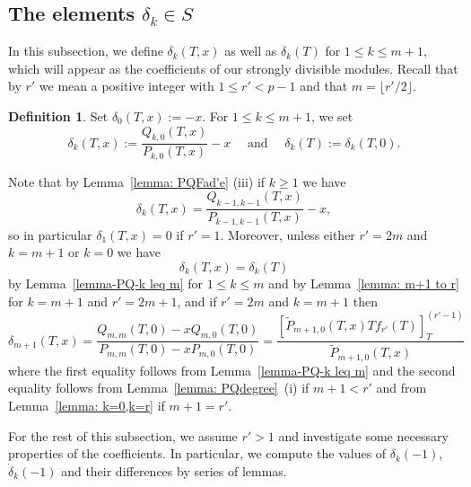 \documentclass[11pt]{amsart}
\theoremstyle{definition}
\numberwithin{equation}{subsection}
\theoremstyle{plain}
\theoremstyle{plain}
\theoremstyle{plain}
\theoremstyle{plain}
\theoremstyle{plain}
\theoremstyle{plain}
\theoremstyle{plain}
\theoremstyle{plain}
\theoremstyle{plain}
\theoremstyle{plain}
\theoremstyle{plain}
\theoremstyle{plain}
\theoremstyle{definition}
\newtheorem{defi}[equation]{Definition}
\theoremstyle{definition}
\theoremstyle{definition}
\theoremstyle{remark}
\renewcommand{\(}{\textup{(}}
\renewcommand{\)}{\textup{)}}
\begin{document}
\subsection{The elements $\delta_{k}\in S$}\label{subsec: the elements delta}
In this subsection, we define $\delta_{k}(T,x)$ as well as $\delta_k(T)$ for $1\leq k\leq m+1$, which will appear as the coefficients of our strongly divisible modules. Recall that by $r'$ we mean a positive integer with $1\leq r'<p-1$ and that $m=\lfloor r'/2\rfloor$.

\begin{defi}\label{defi: definition of delta}
Set $\delta_0(T,x):=-x$. For $1\leq k\leq m+1$, we set
\begin{equation*}
    \delta_k(T,x) :=\frac{Q_{k,0}(T,x)}{P_{k,0}(T,x)}-x\quad\mbox{ and }\quad \delta_k(T):=\delta_k(T,0).
\end{equation*}
\end{defi}

Note that by Lemma~\ref{lemma: PQFad'e} (iii) if $k\geq 1$ we have
    \begin{equation*}
        \delta_k(T,x)=\frac{Q_{k-1,k-1}(T,x)}{P_{k-1,k-1}(T,x)}-x,
    \end{equation*}
so in particular $\delta_1(T,x)=0$ if $r'=1$. Moreover, unless either $r'=2m$ and $k=m+1$ or $k=0$ we have $$\delta_{k}(T,x)=\delta_k(T)$$
by Lemma~\ref{lemma-PQ-k leq m} for $1\leq k\leq m$ and by Lemma~\ref{lemma: m+1 to r} for $k=m+1$ and $r'=2m+1$, and if $r'=2m$ and $k=m+1$ then
    \begin{equation*}
        \delta_{m+1}(T,x)=\frac{Q_{m,m}(T,0)-xQ_{m,0}(T,0)}{P_{m,m}(T,0)-xP_{m,0}(T,0)}=\frac{[\tilde P_{m+1,0}(T,x)Tf_{r'}(T)]_{T}^{(r'-1)}}{\tilde P_{m+1,0}(T,x)}
    \end{equation*}
where the first equality follows from Lemma~\ref{lemma-PQ-k leq m} and the second equality follows from Lemma~\ref{lemma: PQdegree}~(i) if $m+1<r'$ and from Lemma~\ref{lemma: k=0,k=r} if $m+1=r'$.



For the rest of this subsection, we assume $r'>1$ and investigate some necessary properties of the coefficients. In particular, we compute the values of $\delta_k(-1)$, $\dot{\delta}_k(-1)$ and their differences by series of lemmas.
\end{document}
